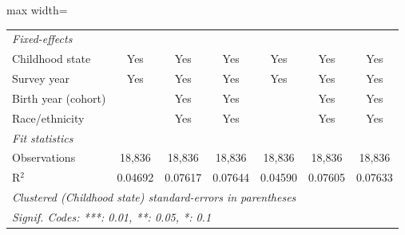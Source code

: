 \begin{adjustbox}{max width=\linewidth}
\begin{tabular}{lcccccc}
      \midrule
      \emph{Fixed-effects}\\
      Childhood state                          & Yes           & Yes           & Yes           & Yes           & Yes           & Yes\\  
      Survey year                              & Yes           & Yes           & Yes           & Yes           & Yes           & Yes\\  
      Birth year (cohort)                      &               & Yes           & Yes           &               & Yes           & Yes\\  
      Race/ethnicity                           &               & Yes           & Yes           &               & Yes           & Yes\\  
      \midrule
      \emph{Fit statistics}\\
      Observations                             & 18,836        & 18,836        & 18,836        & 18,836        & 18,836        & 18,836\\  
      R$^2$                                    & 0.04692       & 0.07617       & 0.07644       & 0.04590       & 0.07605       & 0.07633\\  
      \midrule \midrule
      \multicolumn{7}{l}{\emph{Clustered (Childhood state) standard-errors in parentheses}}\\
      \multicolumn{7}{l}{\emph{Signif. Codes: ***: 0.01, **: 0.05, *: 0.1}}\\
   \end{tabular}
      \end{adjustbox}
\vspace{3pt}\par{}
